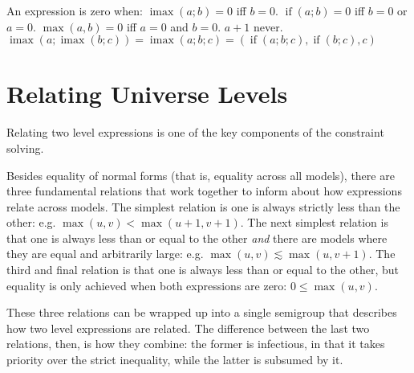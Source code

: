 \documentclass[11pt, twoside, reqno]{book}
\DeclareMathOperator{\imax}{imax}
\DeclareMathOperator{\ifop}{if}
\begin{document}
An expression is zero when:
$\imax(a; b) = 0$ iff $b = 0$.
$\ifop(a; b) = 0$ iff $b = 0$ or $a = 0$.
$\max(a, b) = 0$ iff $a = 0$ and $b = 0$.
$a+1$ never.
$\imax(a; \imax(b; c)) = \imax(a; b; c) = (\ifop(a; b; c), \ifop(b; c), c)$



%
%


\section{Relating Universe Levels}
\label{rel-uni-lvl}

Relating two level expressions is one of the key components of the constraint solving.

Besides equality of normal forms (that is, equality across all models), there are three fundamental relations that work together to inform about how expressions relate across models.
The simplest relation is one is always strictly less than the other: e.g. $\max(u,v) < \max(u+1,v+1)$.
The next simplest relation is that one is always less than or equal to the other \emph{and} there are models where they are equal and arbitrarily large: e.g. $\max(u,v) \lesssim \max(u,v+1)$.
The third and final relation is that one is always less than or equal to the other, but equality is only achieved when both expressions are zero: $0 \leqslant \max(u,v)$.

These three relations can be wrapped up into a single semigroup that describes how two level expressions are related.
The difference between the last two relations, then, is how they combine: the former is infectious, in that it takes priority over the strict inequality, while the latter is subsumed by it.
\end{document}
